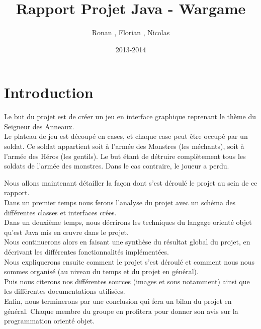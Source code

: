 \documentclass{article}
\title{Rapport Projet Java - Wargame}
\author{Ronan \bsc{Abhamon}, Florian \bsc{Bigard}, Nicolas \bsc{Reynaud}}
\date{2013-2014}
\begin{document}
\maketitle
\newpage

\renewcommand{\contentsname}{Sommaire}
\tableofcontents
\newpage


\section{Introduction}
Le but du projet est de créer un jeu en interface graphique reprenant le thème du Seigneur des Anneaux. \\
Le plateau de jeu est découpé en cases, et chaque case peut être occupé par un soldat. 
Ce soldat appartient soit à l'armée des Monstres (les méchants), soit à l'armée des Héros (les gentils).
Le but étant de détruire complètement tous les soldats de l'armée des monstres. Dans le cas contraire, le joueur a perdu.

Nous allons maintenant détailler la façon dont s'est déroulé le projet au sein de ce rapport. \\
Dans un premier temps nous ferons l'analyse du projet avec un schéma des différentes classes et interfaces crées. \\
Dans un deuxième temps, nous décrirons les techniques du langage orienté objet qu'est Java mis en œuvre dans le projet. \\
Nous continuerons alors en faisant une synthèse du résultat global du projet, en décrivant les différentes fonctionnalités implémentées. \\
Nous expliquerons ensuite comment le projet s'est déroulé et comment nous nous sommes organisé (au niveau du temps et du projet en général). \\
Puis nous citerons nos différentes sources (images et sons notamment) ainsi que les différentes documentations utilisées. \\
Enfin, nous terminerons par une conclusion qui fera un bilan du projet en général.
Chaque membre du groupe en profitera pour donner son avis sur la programmation orienté objet. \\
\end{document}
